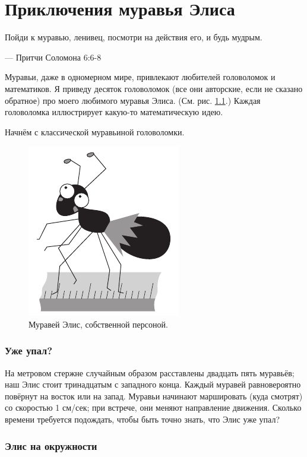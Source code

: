 \chapter{Приключения муравья Элиса}


\setlength{\epigraphwidth}{.67\textwidth}
\epigraph{Пойди к муравью, ленивец, посмотри на действия его, и будь мудрым.
}{--- Притчи Соломона 6:6-8} 

Муравьи, даже в одномерном мире, привлекают любителей головоломок и математиков.
Я приведу десяток головоломок (все они авторские, если не сказано обратное) про моего любимого муравья Элиса.
(См. рис. \ref{pic:alice1}.)
Каждая головоломка иллюстрирует какую-то математическую идею.

Начнём с классической муравьиной головоломки.

\begin{figure}[ht!]
\centering
\includegraphics[scale=.5]{pics/alice1}
\caption{Муравей Элис, собственной персоной.}
\label{pic:alice1}
\end{figure}

\subsection*{Уже упал?}\label{Уже упал?}

На метровом стержне случайным образом расставлены двадцать пять муравьёв; наш Элис стоит тринадцатым с западного конца.
Каждый муравей равновероятно повёрнут на восток или на запад.
Муравьи начинают маршировать (куда смотрят) со скоростью 1 см/сек;
при встрече, они меняют направление движения.
Сколько времени требуется подождать, чтобы быть точно знать, что Элис уже упал?

\subsection*{Элис на окружности}\label{Элис на окружности}

